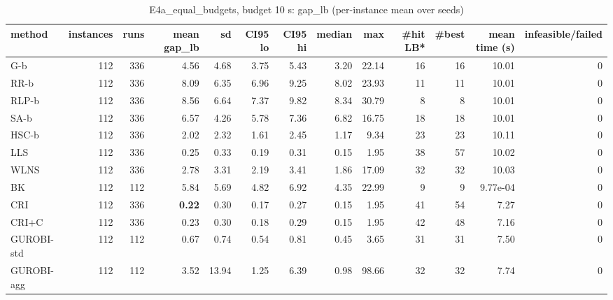 \begin{table}[htbp]
\centering
\small
\caption{E4a\_equal\_budgets, budget 10 s: gap\_lb (per-instance mean over seeds)}
\label{tab:E4a_equal_budgets_b10_summary}
\begin{tabular}{lrrrrrrrrrrrr}
\toprule
method & instances & runs & mean gap\_lb & sd & CI95 lo & CI95 hi & median & max & \#hit LB* & \#best & mean time (s) & infeasible/failed \\
\midrule
G-b & 112 & 336 & 4.56 & 4.68 & 3.75 & 5.43 & 3.20 & 22.14 & 16 & 16 & 10.01 & 0 \\
RR-b & 112 & 336 & 8.09 & 6.35 & 6.96 & 9.25 & 8.02 & 23.93 & 11 & 11 & 10.01 & 0 \\
RLP-b & 112 & 336 & 8.56 & 6.64 & 7.37 & 9.82 & 8.34 & 30.79 & 8 & 8 & 10.01 & 0 \\
SA-b & 112 & 336 & 6.57 & 4.26 & 5.78 & 7.36 & 6.82 & 16.75 & 18 & 18 & 10.01 & 0 \\
HSC-b & 112 & 336 & 2.02 & 2.32 & 1.61 & 2.45 & 1.17 & 9.34 & 23 & 23 & 10.11 & 0 \\
LLS & 112 & 336 & 0.25 & 0.33 & 0.19 & 0.31 & 0.15 & 1.95 & 38 & 57 & 10.02 & 0 \\
WLNS & 112 & 336 & 2.78 & 3.31 & 2.19 & 3.41 & 1.86 & 17.09 & 32 & 32 & 10.03 & 0 \\
BK & 112 & 112 & 5.84 & 5.69 & 4.82 & 6.92 & 4.35 & 22.99 & 9 & 9 & 9.77e-04 & 0 \\
CRI & 112 & 336 & \textbf{0.22} & 0.30 & 0.17 & 0.27 & 0.15 & 1.95 & 41 & 54 & 7.27 & 0 \\
CRI+C & 112 & 336 & 0.23 & 0.30 & 0.18 & 0.29 & 0.15 & 1.95 & 42 & 48 & 7.16 & 0 \\
GUROBI-std & 112 & 112 & 0.67 & 0.74 & 0.54 & 0.81 & 0.45 & 3.65 & 31 & 31 & 7.50 & 0 \\
GUROBI-agg & 112 & 112 & 3.52 & 13.94 & 1.25 & 6.39 & 0.98 & 98.66 & 32 & 32 & 7.74 & 0 \\
\bottomrule
\end{tabular}
\end{table}
